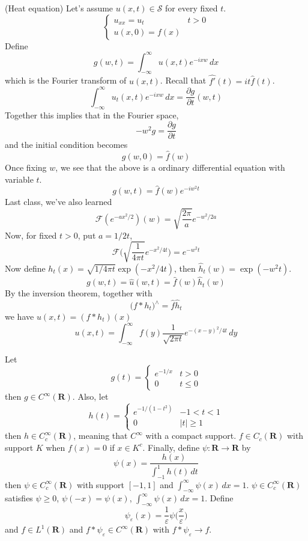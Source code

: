 \vspace{2ex}
\begin{thm}
(Heat equation) Let's assume $u(x,t)\in \mathcal{S}$ for every fixed $t$. 
\[\begin{cases}
u_{xx}=u_{t}&t>0\\
u(x,0)=f(x)
\end{cases}\]
Define 
\[g(w,t)=\int ^{\infty }_{-\infty }u(x,t)e^{-ixw}\,dx\]
which is the Fourier transform of $u(x,t)$. Recall that $\hat{f'}(t)=it\hat{f}(t)$. 
\[\int _{-\infty }^{\infty }u_{t}(x,t)e^{-ixw}\,dx=\frac{\partial g}{\partial t}(w,t) \]
Together this implies that in the Fourier space,
\[-w^2g=\dfrac{\partial g}{\partial t} \]
and the initial condition becomes
\[g(w,0)=\hat{f}(w)\]
Once fixing $w$, we see that the above is a ordinary differential equation with variable $t$. 
\[g(w,t)=\hat{f}(w)e^{-iw^2t}\]
Last class, we've also learned
\[\mathcal{F}(e^{-ax^2/2})(w)=\sqrt{\frac{2\pi }{a}}e^{-w^2/2a}\]
Now, for fixed $t>0$, put $a=1/2t$,
\[\mathcal{F}\Big(\sqrt{\frac{1}{4\pi t}}e^{-x^2/4t}\Big)=e^{-w^2t}\]
Now define $h_{t}(x)=\sqrt{1/4\pi t}\exp (-x^2/4t)$, then $\hat{h}_{t}(w)=\exp (-w^2t)$.
\[g(w,t)=\hat{u}(w,t)=\hat{f}(w)\hat{h}_{t}(w)\]
By the inversion theorem, together with
\[\Big(f\ast h_{t}\Big)^{\wedge}=\hat{f}\hat{h}_{t}\]
we have $u(x,t)=(f\ast h_{t})(x)$
\[u(x,t)=\int ^{\infty }_{-\infty }f(y)\dfrac{1}{\sqrt{2\pi t}}e^{-(x-y)^2/4t}\,dy\]
\end{thm}
\vspace{2ex}
\begin{recall}
Let
\[g(t)=\begin{cases}
e^{-1/x}&t>0\\
0&t\leq 0
\end{cases}\]
then $g\in C^{\infty }({\bm R})$. Also, let 
\[h(t)=\begin{cases}
e^{-1/(1-t^2)}&-1<t<1\\
0&|t|\geq 1
\end{cases}\]
then $h\in C^{\infty }_{c}({\bm R})$, meaning that $C^{\infty }$ with a compact support. $f\in C_{c}({\bm R})$ with support $K$ when $f(x)=0$ if $x\in K^{c}$. Finally, define $\psi :{\bm R}\rightarrow {\bm R}$ by
\[\psi (x)=\dfrac{h(x)}{\int ^{1}_{-1}h(t)\,dt}\]
then $\psi \in C^{\infty }_{c}({\bm R})$ with support $[-1,1]$ and $\int ^{\infty }_{-\infty }\psi (x)\,dx=1$. $\psi \in C^{\infty }_{c}({\bm R})$ satisfies $\psi \geq 0$, $\psi (-x)=\psi (x)$, $\int ^{\infty }_{-\infty }\psi (x)\,dx=1$. Define 
\[\psi _{\varepsilon }(x)=\dfrac{1}{\varepsilon }\psi \Big(\dfrac{x}{\varepsilon  }\Big)\]
and $f\in L^{1}({\bm R})$ and $f\ast \psi _{\varepsilon }\in C^{\infty }({\bm R})$ with $f\ast \psi _{\varepsilon }\rightarrow f$. 
\end{recall}
